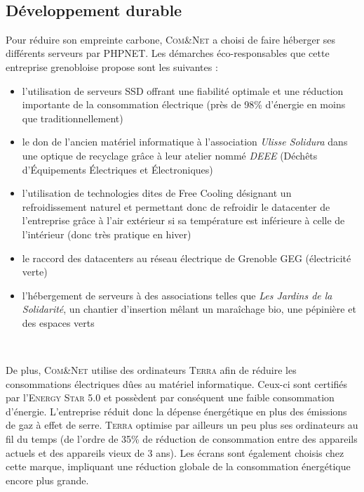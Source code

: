 \documentclass[12pt]{article}
\begin{document}
\

\subsection{Développement durable}

Pour réduire son empreinte carbone, \textsc{Com\&Net} a choisi de faire héberger ses différents serveurs par \textsc{PHPNET}. Les démarches éco-responsables que cette entreprise grenobloise propose sont les suivantes :
\begin{itemize}
	\item l'utilisation de serveurs SSD offrant une fiabilité optimale et une réduction importante de la consommation électrique (près de 98\% d'énergie en moins que traditionnellement)
	\item le don de l'ancien matériel informatique à l'association \textit{Ulisse Solidura} dans une optique de recyclage grâce à leur atelier nommé \textit{DEEE} (Déchêts d'Équipements Électriques et Électroniques)
	\item  l'utilisation de technologies dites de Free Cooling désignant un refroidissement naturel et permettant donc de refroidir le datacenter de l'entreprise grâce à l'air extérieur si sa température est inférieure à celle de l'intérieur (donc très pratique en hiver)
	\item le raccord des datacenters au réseau électrique de Grenoble \textsc{GEG} (électricité verte)
	\item l'hébergement de serveurs à des associations telles que \textit{Les Jardins de la Solidarité}, un chantier d'insertion mêlant un maraîchage bio, une pépinière et des espaces verts
\end{itemize}

\

De plus, \textsc{Com\&Net} utilise des ordinateurs \textsc{Terra} afin de réduire les consommations électriques dûes au matériel informatique. Ceux-ci sont certifiés par l'\textsc{Energy Star 5.0} et possèdent par conséquent une faible consommation d'énergie. L'entreprise réduit donc la dépense énergétique en plus des émissions de gaz à effet de serre. \textsc{Terra} optimise par ailleurs un peu plus ses ordinateurs au fil du temps (de l'ordre de 35\% de réduction de consommation entre des appareils actuels et des appareils vieux de 3 ans). Les écrans sont également choisis chez cette marque, impliquant une réduction globale de la consommation énergétique encore plus grande.

\
\end{document}
